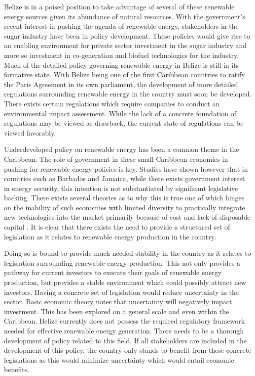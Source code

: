 \documentclass[twocolumn,10pt]{asme2e}
\begin{document}
Belize is in a poised position to take advantage of several of these renewable energy sources given its abundance of natural resources. With the government's recent interest in pushing the agenda of renewable energy, stakeholders in the sugar industry have been in policy development. These policies would give rise to an enabling environment for private sector investment in the sugar industry and more so investment in co-generation and biofuel technologies for the industry. Much of the detailed policy governing renewable energy in Belize is still in its formative state. With Belize being one of the first Caribbean countries to ratify the Paris Agreement in its own parliament, the development of more detailed regulations surrounding renewable energy in the country must soon be developed\cite{paris_caricom}. There exists certain regulations which require companies to conduct an environmental impact assessment. While the lack of a concrete foundation of regulations may be viewed as drawback, the current state of regulations can be viewed favorably. 


Underdeveloped policy on renewable energy has been a common theme in the Caribbean. The role of government in these small Caribbean economies in pushing for renewable energy policies is key. Studies have shown however that in countries such as Barbados and Jamaica, while there exists government interest in energy security, this intention is not substantiated by significant legislative backing. There exists several theories as to why this is true one of which hinges on the inability of such economies with limited diversity to practically integrate new technologies into the market primarily because of cost and lack of disposable capital \cite{carib_energy_trends}. It is clear that there exists the need to provide a structured set of legislation as it relates to renewable energy production in the country. 

Doing so is bound to provide much needed stability in the country as it relates to legislation surrounding renewable energy production. This not only provides a pathway for current investors to execute their goals of renewable energy production, but provides a stable environment which could possibly attract new investors. Having a concrete set of legislation would reduce uncertainty in the sector. Basic economic theory notes that uncertainty will negatively impact investment. This has been explored on a general scale\cite{gen_pol_stab} and even within the Caribbean\cite{carib_pol_stab}. Belize currently does not possess the required regulatory framework needed for effective renewable energy generation. There needs to be a thorough development of policy related to this field. If all stakeholders are included in the development of this policy, the country only stands to benefit from these concrete legislations as this would minimize uncertainty which would entail economic benefits. 
\end{document}
